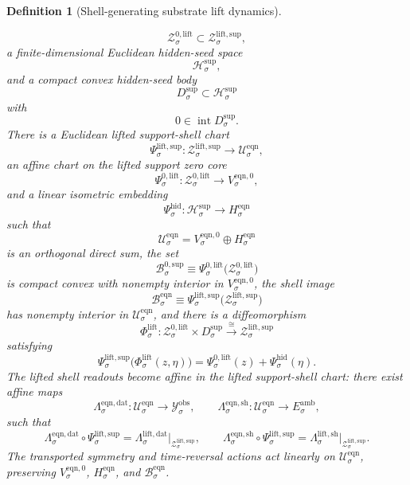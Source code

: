 \documentclass[11pt]{article}
\newcommand{\DataSpace}[1]{\mathcal Y_{#1}^{\mathrm{obs}}}
\newcommand{\AmbientTarget}[1]{E_{#1}^{\mathrm{amb}}}
\newcommand{\EqnSpace}[1]{\mathcal U_{#1}^{\mathrm{eqn}}}
\newcommand{\EqnBody}[1]{\mathcal B_{#1}^{\mathrm{eqn}}}
\newcommand{\EqnData}[1]{\Lambda_{#1}^{\mathrm{eqn,dat}}}
\newcommand{\EqnShell}[1]{\Lambda_{#1}^{\mathrm{eqn,sh}}}
\newcommand{\EqnZero}[1]{V_{#1}^{\mathrm{eqn},0}}
\newcommand{\EqnHidden}[1]{H_{#1}^{\mathrm{eqn}}}
\newcommand{\SeedHidden}[1]{\mathcal H_{#1}^{\mathrm{sup}}}
\newcommand{\SeedHiddenBody}[1]{D_{#1}^{\mathrm{sup}}}
\newcommand{\ZeroBody}[1]{\mathcal B_{#1}^{0,\mathrm{sup}}}
\newcommand{\HiddenChart}[1]{\Psi_{#1}^{\mathrm{hid}}}
\newcommand{\LiftData}[1]{\Lambda_{#1}^{\mathrm{lift,dat}}}
\newcommand{\LiftShellMap}[1]{\Lambda_{#1}^{\mathrm{lift,sh}}}
\newcommand{\LiftSupportShell}[1]{\mathcal Z_{#1}^{\mathrm{lift,sup}}}
\newcommand{\LiftZeroCore}[1]{\mathcal Z_{#1}^{0,\mathrm{lift}}}
\newcommand{\LiftEqChart}[1]{\Psi_{#1}^{\mathrm{lift,sup}}}
\newcommand{\LiftZeroChart}[1]{\Psi_{#1}^{0,\mathrm{lift}}}
\newcommand{\LiftSplit}[1]{\Phi_{#1}^{\mathrm{lift}}}
\newtheorem{definition}{Definition}
\begin{document}
\begin{definition}[Shell-generating substrate lift dynamics]
\begin{enumerate}
    \[
    \LiftZeroCore{\sigma}\subset\LiftSupportShell{\sigma},
    \]
    a finite-dimensional Euclidean hidden-seed space
    \[
    \SeedHidden{\sigma},
    \]
    and a compact convex hidden-seed body
    \[
    \SeedHiddenBody{\sigma}\subset\SeedHidden{\sigma}
    \]
    with
    \[
    0\in\operatorname{int}\SeedHiddenBody{\sigma}.
    \]
    There is a Euclidean lifted support-shell chart
    \[
    \LiftEqChart{\sigma}:\LiftSupportShell{\sigma}\to\EqnSpace{\sigma},
    \]
    an affine chart on the lifted support zero core
    \[
    \LiftZeroChart{\sigma}:\LiftZeroCore{\sigma}\to\EqnZero{\sigma},
    \]
    and a linear isometric embedding
    \[
    \HiddenChart{\sigma}:\SeedHidden{\sigma}\to\EqnHidden{\sigma}
    \]
    such that
    \[
    \EqnSpace{\sigma}
    =
    \EqnZero{\sigma}\oplus\EqnHidden{\sigma}
    \]
    is an orthogonal direct sum, the set
    \[
    \ZeroBody{\sigma}
    \equiv
    \LiftZeroChart{\sigma}\bigl(\LiftZeroCore{\sigma}\bigr)
    \]
    is compact convex with nonempty interior in \(\EqnZero{\sigma}\), the shell image
    \[
    \EqnBody{\sigma}
    \equiv
    \LiftEqChart{\sigma}\bigl(\LiftSupportShell{\sigma}\bigr)
    \]
    has nonempty interior in \(\EqnSpace{\sigma}\), and there is a diffeomorphism
    \begin{equation}
    \LiftSplit{\sigma}:
    \LiftZeroCore{\sigma}\times\SeedHiddenBody{\sigma}
    \xrightarrow{\cong}
    \LiftSupportShell{\sigma}
    \label{eq:liftsplit}
    \end{equation}
    satisfying
    \begin{equation}
    \LiftEqChart{\sigma}\bigl(\LiftSplit{\sigma}(z,\eta)\bigr)
    =
    \LiftZeroChart{\sigma}(z)+\HiddenChart{\sigma}(\eta).
    \label{eq:liftchartsplit}
    \end{equation}
    The lifted shell readouts become affine in the lifted support-shell chart: there exist affine maps
    \[
    \EqnData{\sigma}:\EqnSpace{\sigma}\to\DataSpace{\sigma},
    \qquad
    \EqnShell{\sigma}:\EqnSpace{\sigma}\to\AmbientTarget{\sigma},
    \]
    such that
    \begin{equation}
    \EqnData{\sigma}\circ\LiftEqChart{\sigma}
    =
    \LiftData{\sigma}\big|_{\LiftSupportShell{\sigma}},
    \qquad
    \EqnShell{\sigma}\circ\LiftEqChart{\sigma}
    =
    \LiftShellMap{\sigma}\big|_{\LiftSupportShell{\sigma}}.
    \label{eq:lifteqnchartreadouts}
    \end{equation}
    The transported symmetry and time-reversal actions act linearly on \(\EqnSpace{\sigma}\), preserving \(\EqnZero{\sigma}\), \(\EqnHidden{\sigma}\), and \(\EqnBody{\sigma}\).

\end{enumerate}
\end{definition}
\end{document}
